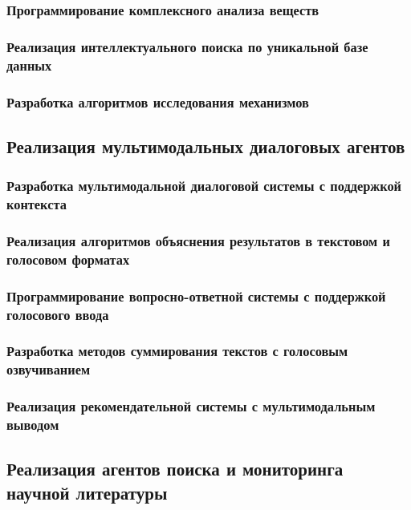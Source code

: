 \documentclass{syksu-coursework}
\begin{document}
\subsubsection{Программирование комплексного анализа веществ}

\subsubsection{Реализация интеллектуального поиска по уникальной базе данных}

\subsubsection{Разработка алгоритмов исследования механизмов}

\subsection{Реализация мультимодальных диалоговых агентов}

\subsubsection{Разработка мультимодальной диалоговой системы с поддержкой контекста}

\subsubsection{Реализация алгоритмов объяснения результатов в текстовом и голосовом форматах}

\subsubsection{Программирование вопросно-ответной системы с поддержкой голосового ввода}

\subsubsection{Разработка методов суммирования текстов с голосовым озвучиванием}

\subsubsection{Реализация рекомендательной системы с мультимодальным выводом}

\subsection{Реализация агентов поиска и мониторинга научной литературы}
\end{document}
